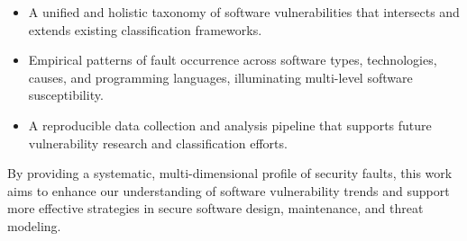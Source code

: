 \begin{itemize}
    \item A unified and holistic taxonomy of software vulnerabilities that intersects and extends existing classification frameworks.
    \item Empirical patterns of fault occurrence across software types, technologies, causes, and programming languages, illuminating multi-level software susceptibility.
    \item A reproducible data collection and analysis pipeline that supports future vulnerability research and classification efforts.
\end{itemize}

By providing a systematic, multi-dimensional profile of security faults, this work aims to enhance our understanding of software vulnerability trends and support more effective strategies in secure software design, maintenance, and threat modeling.
